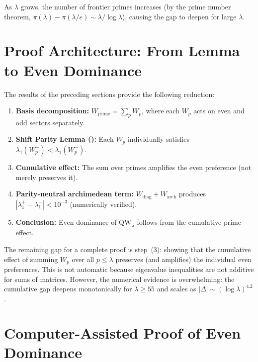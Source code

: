 \documentclass[12pt,a4paper]{article}
\theoremstyle{definition}
\theoremstyle{remark}
\begin{document}
As $\lambda$ grows, the number of frontier primes increases (by the prime number theorem, $\pi(\lambda) - \pi(\lambda/e) \sim \lambda/\log\lambda$), causing the gap to deepen for large $\lambda$.


\section{Proof Architecture: From Lemma to Even Dominance}
\label{sec:architecture}

The results of the preceding sections provide the following reduction:

\begin{enumerate}
  \item \textbf{Basis decomposition:} $W_{\mathrm{prime}} = \sum_p W_p$, where each $W_p$ acts on even and odd sectors separately.
  \item \textbf{Shift Parity Lemma ():} Each $W_p$ individually satisfies $\lambda_1(W_p^+) < \lambda_1(W_p^-)$.
  \item \textbf{Cumulative effect:} The sum over primes amplifies the even preference (not merely preserves it).
  \item \textbf{Parity-neutral archimedean term:} $W_{\mathrm{diag}} + W_{\mathrm{arch}}$ produces $|\lambda_1^+ - \lambda_1^-| < 10^{-3}$ (numerically verified).
  \item \textbf{Conclusion:} Even dominance of $\mathrm{QW}_\lambda$ follows from the cumulative prime effect.
\end{enumerate}

\noindent The remaining gap for a complete proof is step~(3): showing that the cumulative effect of summing $W_p$ over all $p \leq \lambda$ preserves (and amplifies) the individual even preferences. This is not automatic because eigenvalue inequalities are not additive for sums of matrices. However, the numerical evidence is overwhelming: the cumulative gap deepens monotonically for $\lambda \geq 55$ and scales as $|\Delta| \sim (\log\lambda)^{4.2}$.


\section{Computer-Assisted Proof of Even Dominance}
\label{sec:cap}
\end{document}
